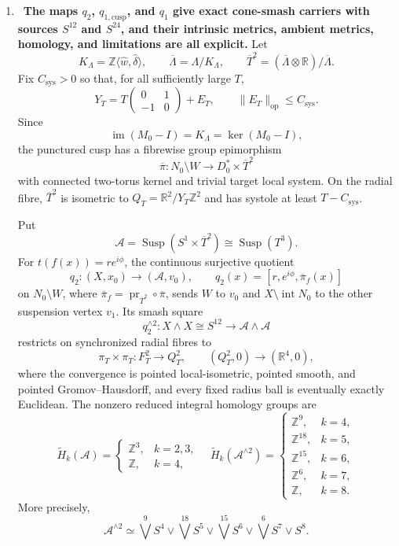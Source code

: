 \begin{enumerate}[leftmargin=1.8em,itemsep=.65em]
\item \Verified\ \textbf{The maps \(q_2\), \(q_{1,\mathrm{cusp}}\), and
\(q_1\) give exact cone-smash carriers with sources \(S^{12}\) and
\(S^{24}\), and their intrinsic metrics, ambient metrics, homology, and
limitations are all explicit.}
Let
\[
 K_\Lambda=\mathbb Z\langle\widehat w,\widehat\delta\rangle,
 \qquad \overline\Lambda=\Lambda/K_\Lambda,
 \qquad \overline T^2=(\overline\Lambda\otimes\mathbb R)/\overline\Lambda.
\]
Fix \(C_{\mathrm{sys}}>0\) so that, for all sufficiently large \(T\),
\[
 Y_T=T\begin{pmatrix}0&1\\-1&0\end{pmatrix}+E_T,
 \qquad \lVert E_T\rVert_{\mathrm{op}}\le C_{\mathrm{sys}}.
\]
Since
\[
 \operatorname{im}(M_0-I)=K_\Lambda=\ker(M_0-I),
\]
the punctured cusp has a fibrewise group epimorphism
\[
 \overline\pi:N_0\setminus W\longrightarrow D_0^*\times\overline T^2
\]
with connected two-torus kernel and trivial target local system.  On the
radial fibre, \(\overline T^2\) is isometric to
\(Q_T=\mathbb R^2/Y_T\mathbb Z^2\) and has systole at least
\(T-C_{\mathrm{sys}}\).

Put
\[
 \mathcal A=\operatorname{Susp}(S^1\times\overline T^2)
 \cong\operatorname{Susp}(T^3).
\]
For \(t(f(x))=re^{i\phi}\), the continuous surjective quotient
\[
 q_2:(X,x_0)\longrightarrow(\mathcal A,v_0),\qquad
 q_2(x)=[r,e^{i\phi},\overline\pi_f(x)]
\]
on \(N_0\setminus W\), where
\(\overline\pi_f=\operatorname{pr}_{\overline T^2}\circ\overline\pi\), sends
\(W\) to \(v_0\) and
\(X\setminus\operatorname{int}N_0\) to the other suspension vertex
\(v_1\).  Its smash square
\[
 q_2^{\wedge2}:X\wedge X\cong S^{12}\longrightarrow
 \mathcal A\wedge\mathcal A
\]
restricts on synchronized radial fibres to
\[
 \pi_T\times\pi_T:F_T^2\longrightarrow Q_T^2,
 \qquad (Q_T^2,0)\longrightarrow(\mathbb R^4,0),
\]
where the convergence is pointed local-isometric, pointed smooth, and
pointed Gromov--Hausdorff, and every fixed radius ball is eventually exactly
Euclidean.  The nonzero reduced integral homology groups are
\[
 \widetilde H_k(\mathcal A)=
 \begin{cases}\mathbb Z^3,&k=2,3,\\ \mathbb Z,&k=4,\end{cases}
\quad
 \widetilde H_k(\mathcal A^{\wedge2})=
 \begin{cases}
 \mathbb Z^9,&k=4,\\ \mathbb Z^{18},&k=5,\\
 \mathbb Z^{15},&k=6,\\ \mathbb Z^6,&k=7,\\ \mathbb Z,&k=8.
 \end{cases}
\]
More precisely,
\[
 \mathcal A^{\wedge2}\simeq
 \bigvee^9S^4\vee\bigvee^{18}S^5\vee\bigvee^{15}S^6
 \vee\bigvee^6S^7\vee S^8.
\]


\end{enumerate}

